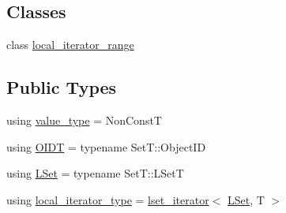 \subsection*{Classes}
\begin{DoxyCompactItemize}
\item 
class \hyperlink{classshad_1_1set__iterator_1_1local__iterator__range}{local\-\_\-iterator\-\_\-range}
\end{DoxyCompactItemize}
\subsection*{Public Types}
\begin{DoxyCompactItemize}
\item 
using \hyperlink{classshad_1_1set__iterator_a589a0c4bbfc806769293462d96439b0f}{value\-\_\-type} = Non\-Const\-T
\item 
using \hyperlink{classshad_1_1set__iterator_a2da49754284fd7ddf591c2df4123b57d}{O\-I\-D\-T} = typename Set\-T\-::\-Object\-I\-D
\item 
using \hyperlink{classshad_1_1set__iterator_a526f8a1656d9a4826cf9d0ec1ab60ac6}{L\-Set} = typename Set\-T\-::\-L\-Set\-T
\item 
using \hyperlink{classshad_1_1set__iterator_a162b1b9d8dfe2e3a656fcdacf0450939}{local\-\_\-iterator\-\_\-type} = \hyperlink{classshad_1_1lset__iterator}{lset\-\_\-iterator}$<$ \hyperlink{classshad_1_1set__iterator_a526f8a1656d9a4826cf9d0ec1ab60ac6}{L\-Set}, T $>$
\end{DoxyCompactItemize}
